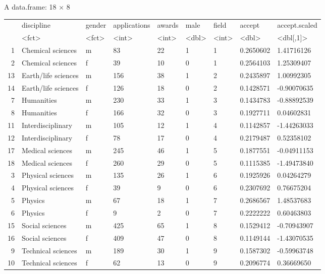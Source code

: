 \documentclass[11pt]{article}
\begin{document}
    A data.frame: 18 × 8
\begin{tabular}{r|llllllll}
  & discipline & gender & applications & awards & male & field & accept & accept.scaled\\
  & <fct> & <fct> & <int> & <int> & <dbl> & <int> & <dbl> & <dbl{[},1{]}>\\
\hline
	1 & Chemical sciences   & m &  83 & 22 & 1 & 1 & 0.2650602 &  1.41716126\\
	2 & Chemical sciences   & f &  39 & 10 & 0 & 1 & 0.2564103 &  1.25309407\\
	13 & Earth/life sciences & m & 156 & 38 & 1 & 2 & 0.2435897 &  1.00992305\\
	14 & Earth/life sciences & f & 126 & 18 & 0 & 2 & 0.1428571 & -0.90070635\\
	7 & Humanities          & m & 230 & 33 & 1 & 3 & 0.1434783 & -0.88892539\\
	8 & Humanities          & f & 166 & 32 & 0 & 3 & 0.1927711 &  0.04602831\\
	11 & Interdisciplinary   & m & 105 & 12 & 1 & 4 & 0.1142857 & -1.44263033\\
	12 & Interdisciplinary   & f &  78 & 17 & 0 & 4 & 0.2179487 &  0.52358102\\
	17 & Medical sciences    & m & 245 & 46 & 1 & 5 & 0.1877551 & -0.04911153\\
	18 & Medical sciences    & f & 260 & 29 & 0 & 5 & 0.1115385 & -1.49473840\\
	3 & Physical sciences   & m & 135 & 26 & 1 & 6 & 0.1925926 &  0.04264279\\
	4 & Physical sciences   & f &  39 &  9 & 0 & 6 & 0.2307692 &  0.76675204\\
	5 & Physics             & m &  67 & 18 & 1 & 7 & 0.2686567 &  1.48537683\\
	6 & Physics             & f &   9 &  2 & 0 & 7 & 0.2222222 &  0.60463803\\
	15 & Social sciences     & m & 425 & 65 & 1 & 8 & 0.1529412 & -0.70943907\\
	16 & Social sciences     & f & 409 & 47 & 0 & 8 & 0.1149144 & -1.43070535\\
	9 & Technical sciences  & m & 189 & 30 & 1 & 9 & 0.1587302 & -0.59963748\\
	10 & Technical sciences  & f &  62 & 13 & 0 & 9 & 0.2096774 &  0.36669650\\
\end{tabular}
\end{document}
